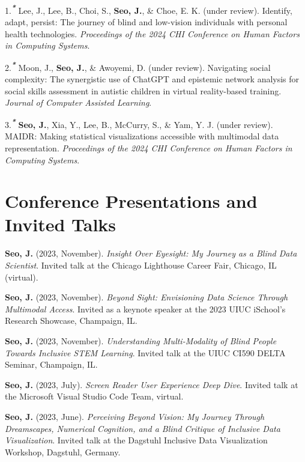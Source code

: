 \documentclass[11pt,a4paper,]{awesome-cv}
\newlength{\cslhangindent}
\newenvironment{CSLReferences}[2] %
 {\begin{list}{}{%
  \setlength{\itemindent}{0pt}
  \setlength{\leftmargin}{0pt}
  \setlength{\parsep}{0pt}
  \ifodd #1
   \setlength{\leftmargin}{\cslhangindent}
   \setlength{\itemindent}{-1\cslhangindent}
  \fi
  \setlength{\itemsep}{#2\baselineskip}}}
 {\end{list}}
\begin{document}
\label{refs-80ba2804df5f1781b1e6fc147e07e3b3}
\begin{CSLReferences}{1}{0}
1.\textsuperscript{\textbf{\emph{*}}} Lee, J., Lee, B., Choi, S.,
\textbf{Seo, J.}, \& Choe, E. K. (under review). Identify, adapt,
persist: The journey of blind and low-vision individuals with personal
health technologies. \emph{Proceedings of the 2024 CHI Conference on
Human Factors in Computing Systems}.

2.\textsuperscript{\textbf{\emph{*}}} Moon, J., \textbf{Seo, J.}, \&
Awoyemi, D. (under review). Navigating social complexity: The
synergistic use of ChatGPT and epistemic network analysis for social
skills assessment in autistic children in virtual reality-based
training. \emph{Journal of Computer Assisted Learning}.

3.\textsuperscript{\textbf{\emph{*}}} \textbf{Seo, J.}, Xia, Y., Lee,
B., McCurry, S., \& Yam, Y. J. (under review). MAIDR: Making statistical
visualizations accessible with multimodal data representation.
\emph{Proceedings of the 2024 CHI Conference on Human Factors in
Computing Systems}.

\end{CSLReferences}

\section{Conference Presentations and Invited
Talks}\label{conference-presentations-and-invited-talks}

\textbf{Seo, J.} (2023, November). \emph{Insight Over Eyesight: My
Journey as a Blind Data Scientist}. Invited talk at the Chicago
Lighthouse Career Fair, Chicago, IL (virtual).

\textbf{Seo, J.} (2023, November). \emph{Beyond Sight: Envisioning Data
Science Through Multimodal Access}. Invited as a keynote speaker at the
2023 UIUC iSchool's Research Showcase, Champaign, IL.

\textbf{Seo, J.} (2023, November). \emph{Understanding Multi-Modality of
Blind People Towards Inclusive STEM Learning}. Invited talk at the UIUC
CI590 DELTA Seminar, Champaign, IL.

\textbf{Seo, J.} (2023, July). \emph{Screen Reader User Experience Deep
Dive}. Invited talk at the Microsoft Visual Studio Code Team, virtual.

\textbf{Seo, J.} (2023, June). \emph{Perceiving Beyond Vision: My
Journey Through Dreamscapes, Numerical Cognition, and a Blind Critique
of Inclusive Data Visualization}. Invited talk at the Dagstuhl Inclusive
Data Visualization Workshop, Dagstuhl, Germany.
\end{document}
